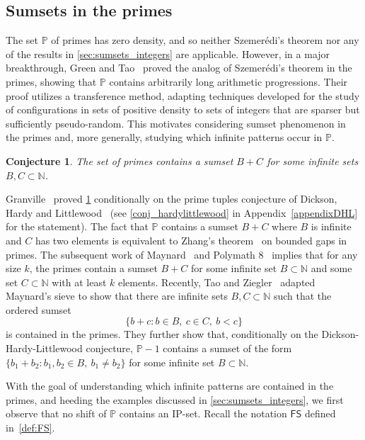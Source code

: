 \documentclass[10pt,dvipsnames]{article}
\newtheorem{conjecture}[theorem]{Conjecture}
\theoremstyle{definition}
\theoremstyle{plain}
\renewcommand{\P}{\mathbb{P}}
\newcommand{\N}{\mathbb{N}}
\newcommand{\Szemeredi}{Szemer\'{e}di}
\newcommand{\FS}{\mathsf{FS}}
\begin{document}
\subsection{Sumsets in the primes}
\label{subsection_primes}

The set $\P$ of primes has zero density, and so neither \Szemeredi{}'s theorem nor any of the results in \cref{sec:sumsets_integers} are applicable.  
However, in a major breakthrough, Green and Tao~\cite{Green_Tao08} proved the analog of \Szemeredi{}'s theorem in the primes, showing that $\P$ contains arbitrarily long arithmetic progressions. 
Their proof 
utilizes a transference method, adapting techniques developed for the  study of configurations in sets of positive density to sets of integers that are sparser but sufficiently pseudo-random.
This motivates considering sumset phenomenon in the primes and, more generally, studying which infinite patterns occur in $\P$.

\begin{conjecture}
\label{q:bcprimes}
The set of primes contains a sumset $B+C$ for some infinite sets $B,C\subset\N$.
\end{conjecture}


Granville~\cite{Granville90} proved \cref{q:bcprimes} conditionally on the prime tuples conjecture of Dickson, Hardy and Littlewood~\cite{Dickson1904, Hardy-Littlewood23} (see \cref{conj_hardylittlewood} in Appendix~\ref{appendixDHL} for the statement).
The fact that $\P$ contains a sumset $B+C$ where $B$ is infinite and $C$ has two elements is equivalent to Zhang's theorem~\cite{Zhang14} on bounded gaps in primes. The subsequent work of Maynard~\cite{Maynard15} and Polymath 8~\cite{Polymath14} implies that for any size $k$, the primes contain a sumset $B+C$ for some infinite set $B\subset\N$ and some set $C\subset\N$ with at least $k$ elements.
Recently, Tao and Ziegler~\cite{TZ23} adapted Maynard's sieve to show that there are infinite sets $B,C \subset \N$ such that the ordered sumset 
\[
\{ b + c : b \in B,~c \in C,~b < c \}
\]
is contained in the primes.
They further show  that, conditionally on  the Dickson-Hardy-Littlewood conjecture, $\P-1$ contains a sumset of the form $\{b_1+b_2: b_1,b_2\in B,~b_1\neq b_2\}$ for some infinite set $B\subset\N$.

With the goal of understanding which infinite patterns are contained in the primes, and heeding the examples discussed in  \cref{sec:sumsets_integers}, we first observe that no shift of $\P$ contains an IP-set.
Recall the notation $\FS$ defined in~\eqref{def:FS}.
\end{document}
